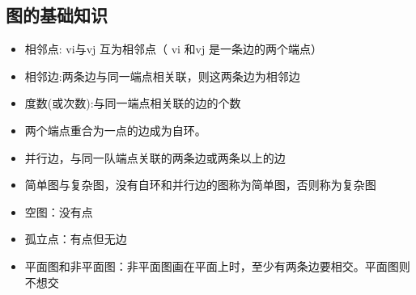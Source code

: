 \subsection{图的基础知识}
\begin{itemize}
	\item 相邻点: vi与vj 互为相邻点（ vi 和vj 是一条边的两个端点）
	\item 相邻边:两条边与同一端点相关联，则这两条边为相邻边
	\item 度数(或次数):与同一端点相关联的边的个数
	\item 两个端点重合为一点的边成为自环。
	\item 并行边，与同一队端点关联的两条边或两条以上的边
	\item 简单图与复杂图，没有自环和并行边的图称为简单图，否则称为复杂图
	\item 空图：没有点
	\item 孤立点：有点但无边
	\item 平面图和非平面图：非平面图画在平面上时，至少有两条边要相交。平面图则不想交	
\end{itemize}
